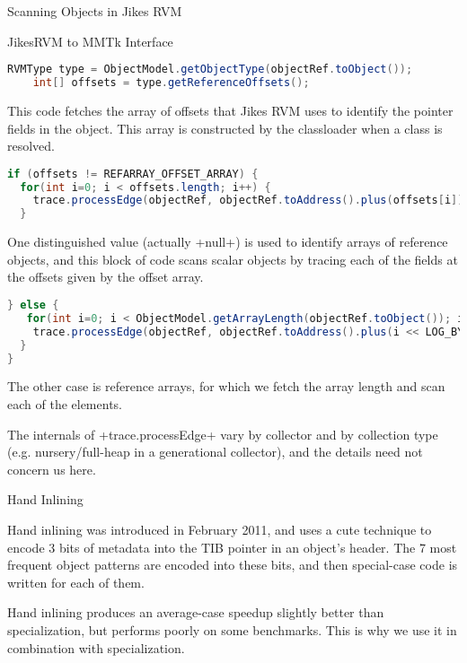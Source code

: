 \begin{section}{Scanning Objects in Jikes RVM}
\begin{subsection}{JikesRVM to MMTk Interface}
\begin{lstlisting}[language=Java]
RVMType type = ObjectModel.getObjectType(objectRef.toObject());
    int[] offsets = type.getReferenceOffsets();
\end{lstlisting}

This code fetches the array of offsets that Jikes RVM uses to identify the pointer fields in the object.  This array is constructed by the classloader when a class is resolved.

\begin{lstlisting}[language=Java]
if (offsets != REFARRAY_OFFSET_ARRAY) {
  for(int i=0; i < offsets.length; i++) {
    trace.processEdge(objectRef, objectRef.toAddress().plus(offsets[i]));
  }
\end{lstlisting}

One distinguished value (actually \spverb+null+) is used to identify arrays of reference objects, and this block of code scans scalar objects by tracing each of the fields at the offsets given by the offset array.
\begin{lstlisting}[language=Java]
} else {
   for(int i=0; i < ObjectModel.getArrayLength(objectRef.toObject()); i++) {
    trace.processEdge(objectRef, objectRef.toAddress().plus(i << LOG_BYTES_IN_ADDRESS));
  }
}
\end{lstlisting}

The other case is reference arrays, for which we fetch the array length and scan each of the elements.

The internals of \spverb+trace.processEdge+ vary by collector and by collection type (e.g. nursery/full-heap in a generational collector), and the details need not concern us here.

\end{subsection}

\begin{subsection}{Hand Inlining}

Hand inlining was introduced in February 2011, and uses a cute technique to encode 3 bits of metadata into the TIB pointer in an object's header.  The 7 most frequent object patterns are encoded into these bits, and then special-case code is written for each of them.

Hand inlining produces an average-case speedup slightly better than specialization, but performs poorly on some benchmarks.  This is why we use it in combination with specialization.

\end{subsection}


\end{section}
